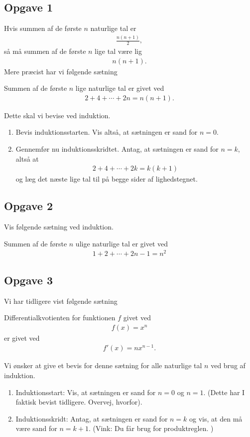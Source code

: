 \subsection*{Opgave 1}
Hvis summen af de første $n$ naturlige tal er
\begin{align*}
	\frac{n(n+1)}{2},
\end{align*}
så må summen af de første $n$ lige tal være lig
\begin{align*}
	n(n+1).
\end{align*}
Mere præcist har vi følgende sætning
\begin{setn}
	Summen af de første $n$ lige naturlige tal er givet ved
	\begin{align*}
		2 + 4 + \cdots + 2n = n(n+1).
	\end{align*}
\end{setn}
Dette skal vi bevise ved induktion.
\begin{enumerate}[label=\roman*)]
	\item Bevis induktionsstarten. Vis altså, at sætningen er sand for $n = 0$. 
	\item Gennemfør nu induktionsskridtet. Antag, at sætningen er sand for $n = k$, altså at
	\begin{align*}
		2 + 4 + \cdots + 2k = k(k+1)
	\end{align*}
	og læg det næste lige tal til på begge sider af lighedstegnet. 
\end{enumerate}
\subsection*{Opgave 2}
Vis følgende sætning ved induktion.
\begin{setn}
	Summen af de første $n$ ulige naturlige tal er givet ved
	\begin{align*}
		1 + 2 + \cdots + 2n - 1 = n^2
	\end{align*}
\end{setn}
\subsection*{Opgave 3}
Vi har tidligere vist følgende sætning
\begin{setn}[Potensreglen]
	Differentialkvotienten for funktionen $f$ givet ved
	\begin{align*}
		f(x) = x^n
	\end{align*}
	er givet ved
	\begin{align*}
		f'(x) = nx^{n-1}.
	\end{align*}
\end{setn}
Vi ønsker at give et bevis for denne sætning for alle naturlige tal $n$ ved brug af induktion. 
\begin{enumerate}[label=\roman*)]
	\item Induktionsstart: Vis, at sætningen er sand for $n = 0$ og $n = 1$. (Dette har I faktisk bevist tidligere. 
	Overvej, hvorfor).
	\item Induktionsskridt: Antag, at sætningen er sand for $n = k$ og vis, at den må være sand for $n = k + 1$. 
	(Vink: Du får brug for produktreglen. )
\end{enumerate}
